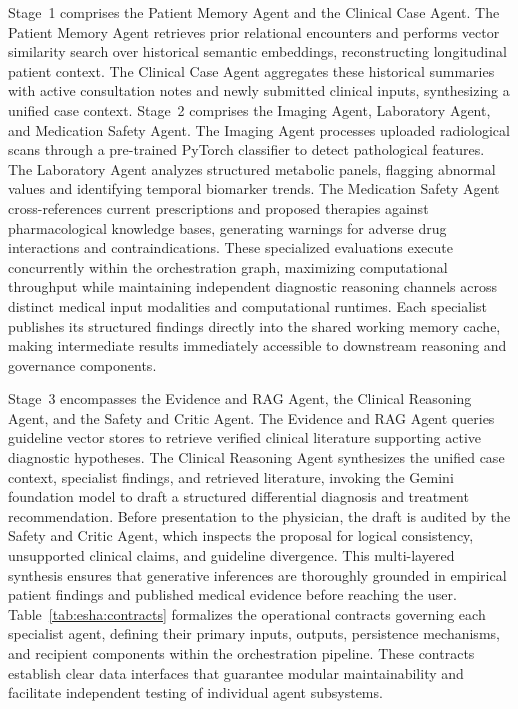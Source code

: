 Stage~1 comprises the Patient Memory Agent and the Clinical Case Agent. The Patient Memory Agent retrieves prior relational encounters and performs vector similarity search over historical semantic embeddings, reconstructing longitudinal patient context. The Clinical Case Agent aggregates these historical summaries with active consultation notes and newly submitted clinical inputs, synthesizing a unified case context. Stage~2 comprises the Imaging Agent, Laboratory Agent, and Medication Safety Agent. The Imaging Agent processes uploaded radiological scans through a pre-trained PyTorch classifier to detect pathological features. The Laboratory Agent analyzes structured metabolic panels, flagging abnormal values and identifying temporal biomarker trends. The Medication Safety Agent cross-references current prescriptions and proposed therapies against pharmacological knowledge bases, generating warnings for adverse drug interactions and contraindications. These specialized evaluations execute concurrently within the orchestration graph, maximizing computational throughput while maintaining independent diagnostic reasoning channels across distinct medical input modalities and computational runtimes. Each specialist publishes its structured findings directly into the shared working memory cache, making intermediate results immediately accessible to downstream reasoning and governance components.

Stage~3 encompasses the Evidence and RAG Agent, the Clinical Reasoning Agent, and the Safety and Critic Agent. The Evidence and RAG Agent queries guideline vector stores to retrieve verified clinical literature supporting active diagnostic hypotheses. The Clinical Reasoning Agent synthesizes the unified case context, specialist findings, and retrieved literature, invoking the Gemini foundation model to draft a structured differential diagnosis and treatment recommendation. Before presentation to the physician, the draft is audited by the Safety and Critic Agent, which inspects the proposal for logical consistency, unsupported clinical claims, and guideline divergence. This multi-layered synthesis ensures that generative inferences are thoroughly grounded in empirical patient findings and published medical evidence before reaching the user. Table~\ref{tab:esha:contracts} formalizes the operational contracts governing each specialist agent, defining their primary inputs, outputs, persistence mechanisms, and recipient components within the orchestration pipeline. These contracts establish clear data interfaces that guarantee modular maintainability and facilitate independent testing of individual agent subsystems.

